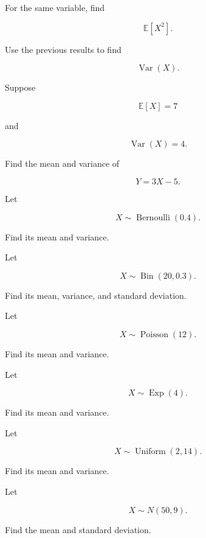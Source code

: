 \begin{exercise}[2]
For the same variable, find

\[
\mathbb{E}[X^2].
\]
\end{exercise}

\begin{exercise}[2]
Use the previous results to find

\[
\operatorname{Var}(X).
\]
\end{exercise}

\begin{exercise}[2]
Suppose

\[
\mathbb{E}[X]=7
\]

and

\[
\operatorname{Var}(X)=4.
\]

Find the mean and variance of

\[
Y=3X-5.
\]
\end{exercise}

\begin{exercise}[2]
Let

\[
X\sim\operatorname{Bernoulli}(0.4).
\]

Find its mean and variance.
\end{exercise}

\begin{exercise}[2]
Let

\[
X\sim\operatorname{Bin}(20,0.3).
\]

Find its mean, variance, and standard deviation.
\end{exercise}

\begin{exercise}[2]
Let

\[
X\sim\operatorname{Poisson}(12).
\]

Find its mean and variance.
\end{exercise}

\begin{exercise}[2]
Let

\[
X\sim\operatorname{Exp}(4).
\]

Find its mean and variance.
\end{exercise}

\begin{exercise}[2]
Let

\[
X\sim\operatorname{Uniform}(2,14).
\]

Find its mean and variance.
\end{exercise}

\begin{exercise}[2]
Let

\[
X\sim N(50,9).
\]

Find the mean and standard deviation.
\end{exercise}

